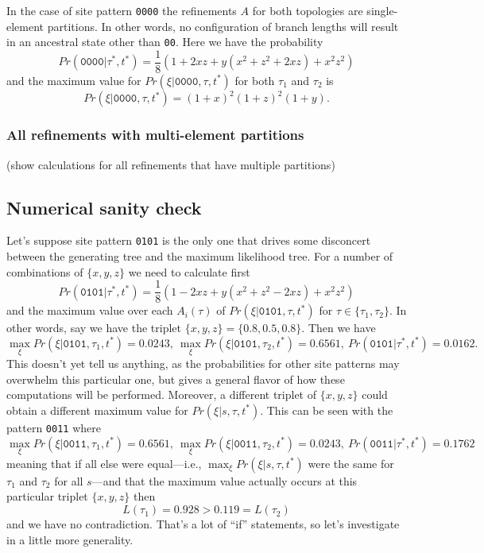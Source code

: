 In the case of site pattern \texttt{0000} the refinements $A$ for both topologies are single-element partitions.
In other words, no configuration of branch lengths will result in an ancestral state other than \texttt{00}.
Here we have the probability
$$
Pr(\texttt{0000} | \tau^*, t^*) = \frac{1}{8}(1+2xz+y(x^2+z^2+2xz)+x^2z^2)
$$
and the maximum value for $Pr(\xi | \texttt{0000}, \tau, t^*)$ for both $\tau_1$ and $\tau_2$ is
$$
Pr(\xi | \texttt{0000}, \tau, t^*) = (1+x)^2(1+z)^2(1+y).
$$

\subsubsection{All refinements with multi-element partitions}

(show calculations for all refinements that have multiple partitions)

\subsection{Numerical sanity check}

Let's suppose site pattern \texttt{0101} is the only one that drives some disconcert between the generating tree and the maximum likelihood tree.
For a number of combinations of $\{x,y,z\}$ we need to calculate first
$$
Pr(\texttt{0101} | \tau^*, t^*) = \frac{1}{8}(1-2xz+y(x^2+z^2-2xz)+x^2z^2)
$$
and the maximum value over each $A_i(\tau)$ of $Pr(\xi | \texttt{0101}, \tau, t^*)$ for $\tau\in\{\tau_1, \tau_2\}$.
In other words, say we have the triplet $\{x,y,z\}=\{0.8,0.5,0.8\}$.
Then we have
$$
\max_{\xi} Pr(\xi | \texttt{0101}, \tau_1, t^*) = 0.0243, \ \max_{\xi} Pr(\xi | \texttt{0101}, \tau_2, t^*) = 0.6561, \ Pr(\texttt{0101} | \tau^*, t^*) = 0.0162.
$$
This doesn't yet tell us anything, as the probabilities for other site patterns may overwhelm this particular one, but gives a general flavor of how these computations will be performed.
Moreover, a different triplet of $\{x,y,z\}$ could obtain a different maximum value for $Pr(\xi | s, \tau, t^*)$.
This can be seen with the pattern \texttt{0011} where
$$
\max_{\xi} Pr(\xi | \texttt{0011}, \tau_1, t^*) = 0.6561, \ \max_{\xi} Pr(\xi | \texttt{0011}, \tau_2, t^*) = 0.0243, \ Pr(\texttt{0011} | \tau^*, t^*) = 0.1762
$$
meaning that if all else were equal---i.e., $\max_{\xi} Pr(\xi | s, \tau, t^*)$ were the same for $\tau_1$ and $\tau_2$ for all $s$---and that the maximum value actually occurs at this particular triplet $\{x,y,z\}$ then
$$
L(\tau_1) = 0.928 > 0.119 = L(\tau_2)
$$
and we have no contradiction.
That's a lot of ``if'' statements, so let's investigate in a little more generality.

